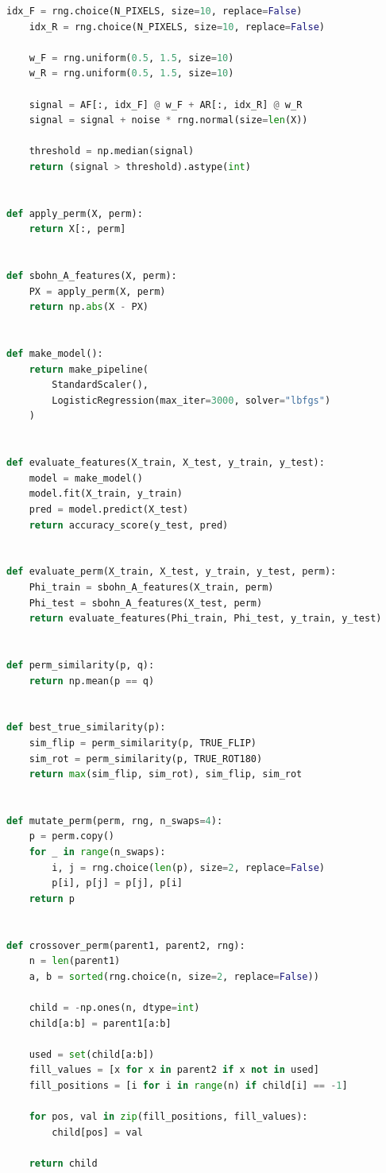 \documentclass[11pt,a4paper]{report}
\begin{document}
\begin{lstlisting}[language=Python]
    idx_F = rng.choice(N_PIXELS, size=10, replace=False)
    idx_R = rng.choice(N_PIXELS, size=10, replace=False)

    w_F = rng.uniform(0.5, 1.5, size=10)
    w_R = rng.uniform(0.5, 1.5, size=10)

    signal = AF[:, idx_F] @ w_F + AR[:, idx_R] @ w_R
    signal = signal + noise * rng.normal(size=len(X))

    threshold = np.median(signal)
    return (signal > threshold).astype(int)


def apply_perm(X, perm):
    return X[:, perm]


def sbohn_A_features(X, perm):
    PX = apply_perm(X, perm)
    return np.abs(X - PX)


def make_model():
    return make_pipeline(
        StandardScaler(),
        LogisticRegression(max_iter=3000, solver="lbfgs")
    )


def evaluate_features(X_train, X_test, y_train, y_test):
    model = make_model()
    model.fit(X_train, y_train)
    pred = model.predict(X_test)
    return accuracy_score(y_test, pred)


def evaluate_perm(X_train, X_test, y_train, y_test, perm):
    Phi_train = sbohn_A_features(X_train, perm)
    Phi_test = sbohn_A_features(X_test, perm)
    return evaluate_features(Phi_train, Phi_test, y_train, y_test)


def perm_similarity(p, q):
    return np.mean(p == q)


def best_true_similarity(p):
    sim_flip = perm_similarity(p, TRUE_FLIP)
    sim_rot = perm_similarity(p, TRUE_ROT180)
    return max(sim_flip, sim_rot), sim_flip, sim_rot


def mutate_perm(perm, rng, n_swaps=4):
    p = perm.copy()
    for _ in range(n_swaps):
        i, j = rng.choice(len(p), size=2, replace=False)
        p[i], p[j] = p[j], p[i]
    return p


def crossover_perm(parent1, parent2, rng):
    n = len(parent1)
    a, b = sorted(rng.choice(n, size=2, replace=False))

    child = -np.ones(n, dtype=int)
    child[a:b] = parent1[a:b]

    used = set(child[a:b])
    fill_values = [x for x in parent2 if x not in used]
    fill_positions = [i for i in range(n) if child[i] == -1]

    for pos, val in zip(fill_positions, fill_values):
        child[pos] = val

    return child



\end{lstlisting}
\end{document}
